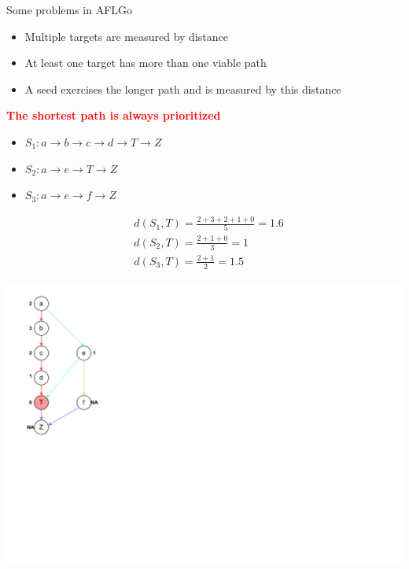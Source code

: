 \documentclass[10pt,aspectratio=43]{beamer}
\begin{document}
\begin{frame}{Some problems in AFLGo}
{\begin{minipage}[t]{0.7\linewidth}
{                \begin{itemize}
                    \item  Multiple targets are measured by distance
                    \item  At least one target has more than one viable path
                    \item  A seed exercises the longer path and is measured by this distance
                \end{itemize} 
            }
            \textbf{\textcolor{red}{The shortest path is always prioritized}}
            {
                \begin{itemize}
                    \item $S_1:a \to b \to c \to d \to T \to Z$
                    \item $S_2:a \to e \to T \to Z$
                    \item $S_3:a \to e \to f \to Z$
                \end{itemize}
                \begin{align*}
                    &d(S_1,T)=\frac{2+3+2+1+0}{5}=1.6\\
                    &d(S_2,T)=\frac{2+1+0}{3}=1\\
                    &d(S_3,T)=\frac{2+1}{2}=1.5
                \end{align*}
            } 
        \end{minipage}
        \begin{minipage}[t]{0.28\linewidth}
            \vspace{0pt}
            \centering
            \includegraphics[width=0.9\linewidth]{pic/trace.pdf}
        \end{minipage}  
}
\end{frame}
\end{document}
